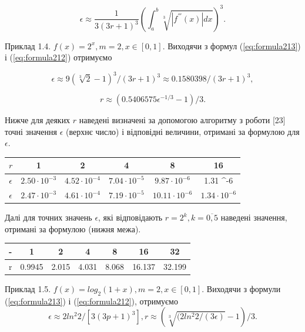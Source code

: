 \documentclass[ukrainian,14pt]{extarticle}
\begin{document}
\begin{equation}\label{eq:formula213}
    \epsilon \approx \frac{1}{3(3r + 1)^3} \left( \int_a^b \sqrt[3]{|f^{'''}(x)| dx} \right)^3.
\end{equation}

Приклад 1.4. $f(x) = 2^x, m = 2, x \in [0,1].$ Виходячи з формул (\ref{eq:formula213}) і (\ref{eq:formula212}) отримуємо

$$\epsilon \approx 9(\sqrt[3]{2} - 1)^3 / (3r + 1)^3 \approx 0.1580398 / (3r + 1)^3,$$

$$r \approx (0.5406575 \epsilon^{-1/3} - 1) / 3.$$

Нижче для деяких $r$ наведені визначені за допомогою алгоритму з роботи [23] точні значення $\epsilon$ (верхнє число) і відповідні величини, отримані за формулою для $\epsilon$.

\bgroup
\def\arraystretch{1.5}
\begin{center}
\begin{tabular}{ c | c |
c | c | c | c}
 $r$ & 1 & 2 & 4 & 8 & 16 \\
 \hline
 $\epsilon$ & $2.50 \cdot 10^{-3}$ & $4.52 \cdot 10^{-4}$ & $7.04 \cdot 10^{-5}$ & $9.87 \cdot 10^{-6}$ & 1.31 \cdot 10^{-6} \\  
 \hline
  $\epsilon$ & $2.47 \cdot 10^{-3}$ & $4.61 \cdot 10^{-4}$ & $7.19 \cdot 10^{-5}$ & $10.11 \cdot 10^{-6}$ & $1.34 \cdot 10^{-6}$ \\  
\end{tabular}
\end{center}
\egroup

Далі для точних значень $\epsilon$, які відповідають $r = 2^k, k = \overline{0, 5}$ наведені значення, отримані за формулою (нижня межа).

\bgroup
\def\arraystretch{1.5}
\begin{center}
\begin{tabular}{ c | c |
c | c | c | c | c}
 - & 1 & 2 & 4 & 8 & 16 & 32 \\
 \hline
 r & 0.9945 & 2.015 & 4.031 & 8.068 & 16.137 & 32.199 \\  

\end{tabular}
\end{center}
\egroup

Приклад 1.5. $f(x) = log_2 (1+x), m = 2, x \in [0, 1].$ Виходячи з формули  (\ref{eq:formula213}) і (\ref{eq:formula212}), отримуємо
    $$\epsilon \approx 2 ln^2 2/[3(3p + 1)^3], r \approx (\sqrt[3]{(2 ln^2 2/ (3\epsilon)} - 1) /3.$$
    
\end{document}
